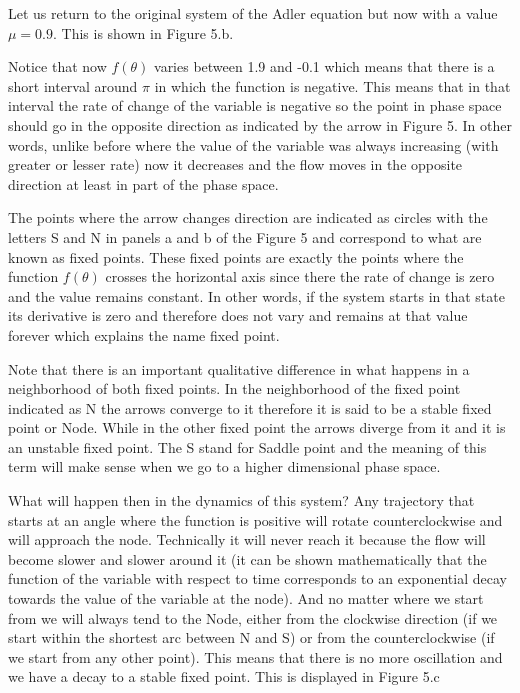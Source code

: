 \documentclass{article}
\begin{document}
Let us return to the original system of the Adler equation but now with a value $\mu=0.9$. This is shown in Figure 5.b. 

Notice that now $f(\theta)$ varies between 1.9 and -0.1 which means that there is a short interval around $\pi$ in which the function is negative. 
This means that in that interval the rate of change of the variable is negative so the point in phase space should go in the opposite direction as indicated by the arrow in Figure 5. 
In other words, unlike before where the value of the variable was always increasing (with greater or lesser rate) now it decreases and the flow moves in the opposite direction at least in part of the phase space.  

The points where the arrow changes direction are indicated as circles with the letters S and N in panels a and b of the Figure 5 and correspond to what are known as fixed points. These fixed points are exactly the points where the function $f(\theta)$ crosses the horizontal axis since there the rate of change is zero and the value remains constant. 
In other words, if the system starts in that state its derivative is zero and therefore does not vary and remains at that value forever which explains the name fixed point. 

Note that there is an important qualitative difference in what happens in a neighborhood of both fixed points. 
In the neighborhood of the fixed point indicated as N the arrows converge to it therefore it is said to be a stable fixed point or Node.  
While in the other fixed point the arrows diverge from it and it is an unstable fixed point. The S stand for Saddle point and the meaning of this term will make sense when we go to a higher dimensional phase space.

What will happen then in the dynamics of this system? 
Any trajectory that starts at an angle where the function is positive will rotate counterclockwise and will approach the node. 
Technically it will never reach it because the flow will become slower and slower around it (it can be shown mathematically that the function of the variable with respect to time corresponds to an exponential decay towards the value of the variable at the node). 
And no matter where we start from we will always tend to the Node, either from the clockwise direction (if we start within the shortest arc between N and S) or from the counterclockwise (if we start from any other point). 
This means that there is no more oscillation and we have a decay to a stable fixed point.
This is displayed in Figure 5.c
\end{document}
